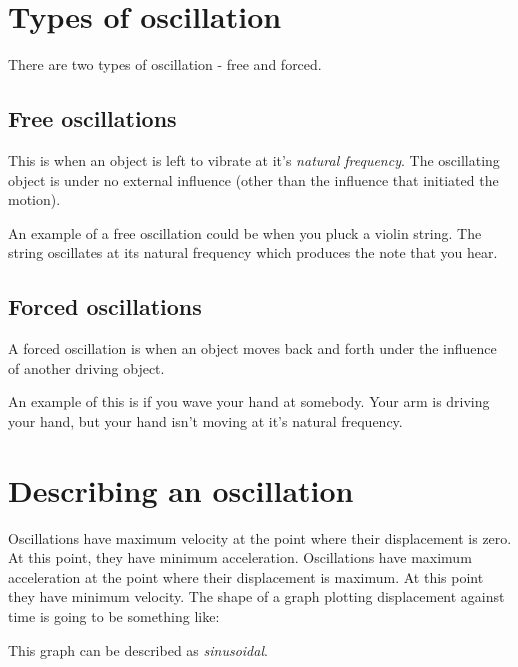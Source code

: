 \documentclass{article}
\begin{document}
\section*{Types of oscillation}
There are two types of oscillation - free and forced.
\subsection*{Free oscillations}
This is when an object is left to vibrate at it's \textit{natural frequency}. The oscillating object is under no external influence (other than the influence that initiated the motion). 

An example of a free oscillation could be when you pluck a violin string. The string oscillates at its natural frequency which produces the note that you hear.
\subsection*{Forced oscillations}
A forced oscillation is when an object moves back and forth under the influence of another driving object.

An example of this is if you wave your hand at somebody. Your arm is driving your hand, but your hand isn't moving at it's natural frequency.

\section*{Describing an oscillation}
Oscillations have maximum velocity at the point where their displacement is zero. At this point, they have minimum acceleration.
Oscillations have maximum acceleration at the point where their displacement is maximum. At this point they have minimum velocity.
The shape of a graph plotting displacement against time is going to be something like:


This graph can be described as \textit{sinusoidal}.
\end{document}
